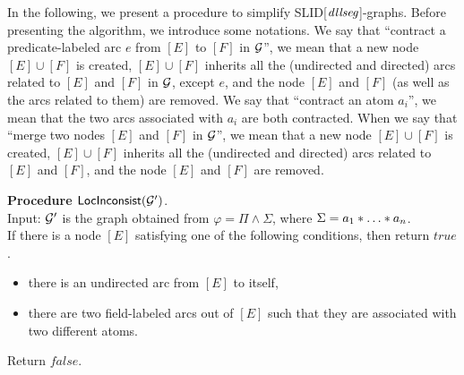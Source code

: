 \documentclass{llncs}
\begin{document}




In the following, we present a procedure to simplify SLID[$\mathit{dllseg}$]-graphs.
Before presenting the algorithm, we introduce some notations. We say that ``contract a predicate-labeled arc $e$ from $[E]$ to $[F]$ in $\mathcal{G}$'', we mean that a new node $[E] \cup [F]$ is created, $[E] \cup [F]$ inherits all the (undirected and directed) arcs related to $[E]$ and $[F]$ in $\mathcal{G}$, except $e$, and the node $[E]$ and $[F]$ (as well as the arcs related to them) are removed.  We say that ``contract an atom $a_i$'', we mean that the two arcs associated with $a_i$ are both contracted. When we say that ``merge two nodes $[E]$ and $[F]$ in $\mathcal{G}$'', we mean that a new node $[E] \cup [F]$ is created, $[E] \cup [F]$ inherits all the (undirected and directed) arcs related to $[E]$ and $[F]$, and the node $[E]$ and $[F]$ are removed. 

\newcommand\persistsimp{{\sf PersistSimp}}

\newcommand\simp{{\sf Simp}}

\newcommand\locinconsist{{\sf LocInconsist}}

\smallskip

\noindent
{\bf Procedure $\locinconsist(\Gg')$}.\\
Input: $\mathcal{G}'$ is the graph obtained from $\varphi = \Pi \wedge \Sigma$, where $\Sigma=a_1 \sep \dots \sep a_n$.\\
%
If there is a node $[E]$ satisfying one of the following conditions, then return $true$.
\begin{itemize}
\item there is an undirected arc from $[E]$ to itself,
%
\item there are two field-labeled arcs out of $[E]$ such that they are associated with two different atoms.
\end{itemize}
Return $false$.
\end{document}
